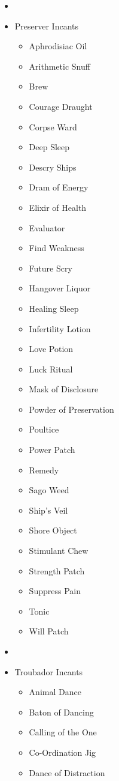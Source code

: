\begin{itemize}[leftmargin=0pt]
	\item[] 
	\item[] Preserver Incants
	\begin{itemize}[leftmargin=0pt]
		\item[] Aphrodisiac Oil
		\item[] Arithmetic Snuff
		\item[] Brew
		\item[] Courage Draught
		\item[] Corpse Ward
		\item[] Deep Sleep
		\item[] Descry Ships
		\item[] Dram of Energy
		\item[] Elixir of Health
		\item[] Evaluator
		\item[] Find Weakness
		\item[] Future Scry
		\item[] Hangover Liquor
		\item[] Healing Sleep
		\item[] Infertility Lotion
		\item[] Love Potion
		\item[] Luck Ritual
		\item[] Mask of Disclosure
		\item[] Powder of Preservation
		\item[] Poultice
		\item[] Power Patch
		\item[] Remedy
		\item[] Sago Weed
		\item[] Ship's Veil
		\item[] Shore Object
		\item[] Stimulant Chew
		\item[] Strength Patch
		\item[] Suppress Pain
		\item[] Tonic
		\item[] Will Patch
	\end{itemize}
	\item[] 
	\item[] Troubador Incants
	\begin{itemize}[leftmargin=0pt]
		\item[] Animal Dance
		\item[] Baton of Dancing
		\item[] Calling of the One
		\item[] Co-Ordination Jig
		\item[] Dance of Distraction

\end{itemize}
\end{itemize}
